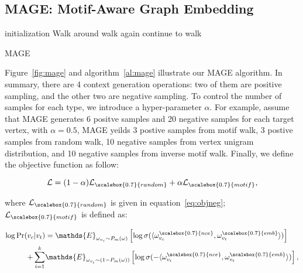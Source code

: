 \documentclass[letterpaper]{article}
\begin{document}

        \subsection{MAGE: Motif-Aware Graph Embedding}

            \begin{algorithm}
                \DontPrintSemicolon
                initialization\;
                 {
                    Walk around\;
                     {
                        walk again\;
                    } {
                        continue to walk\;
                    }
                }
                \caption{MAGE}
                \label{al:mage}
            \end{algorithm}

            Figure~\ref{fig:mage} and algorithm~\ref{al:mage} illustrate our MAGE algorithm. In summary, 
            there are 4 context generation operations: two of them are positive sampling, and the other
            two are negative sampling. To control the number of samples for each type, we introduce a 
            hyper-parameter $\alpha$. For example, assume that MAGE generates 6 positve samples and 
            20 negative samples for each target vertex, with $\alpha=0.5$, MAGE yeilds 3 postive samples 
            from motif walk, 3 postive samples from random walk, 10 negative samples from vertex unigram
            distribution, and 10 negative samples from inverse motif walk.  Finally, we define the 
            objective function as follow:


            \begin{equation}
                \label{eq:mageobj}
                \mathcal{L} = (1-\alpha) \mathcal{L}_{\scalebox{0.7}{random}} + 
                                \alpha \mathcal{L}_{\scalebox{0.7}{motif}} ,
            \end{equation}

            \noindent
            where $\mathcal{L}_{\scalebox{0.7}{random}}$ is given in equation~\ref{eq:objneg};
            $\mathcal{L}_{\scalebox{0.7}{motif}}$ is defined as:

            \begin{equation}
                \label{eq:objmotif}
                \begin{aligned}
                    \log \mbox{Pr} (v_c | v_t) & = \mathds{E}_{\omega_{v_c} \sim P_m(\omega)} \left[ \log \sigma( \langle \omega^{\scalebox{0.7}{nce}}_{v_c} , \omega^{\scalebox{0.7}{emb}}_{v_t} \rangle ) \right] \\
                + \sum_{i=1}^{k} & \mathds{E}_{\omega_{v_i} \sim (1-P_m(\omega))} \left[ \log \sigma( -\langle \omega^{\scalebox{0.7}{nce}}_{v_i} , \omega^{\scalebox{0.7}{emb}}_{v_t} \rangle) \right],
                \end{aligned}
            \end{equation}
\end{document}
